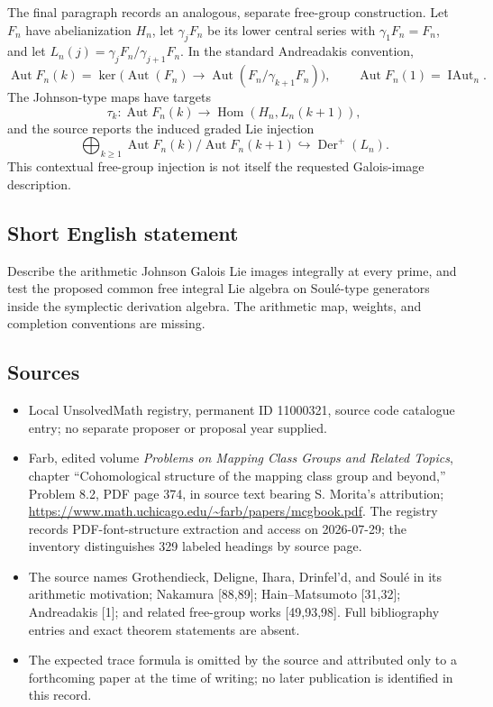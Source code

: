 \documentclass[11pt]{article}
\begin{document}
The final paragraph records an analogous, separate free-group construction. Let $F_n$ have abelianization $H_n$, let $\gamma_jF_n$ be its lower central series with $\gamma_1F_n=F_n$, and let $L_n(j)=\gamma_jF_n/\gamma_{j+1}F_n$. In the standard Andreadakis convention,
\[
 \operatorname{Aut}F_n(k)=\ker\bigl(\operatorname{Aut}(F_n)\to
 \operatorname{Aut}(F_n/\gamma_{k+1}F_n)\bigr),\qquad
 \operatorname{Aut}F_n(1)=\operatorname{IAut}_n.
\]
The Johnson-type maps have targets
\[
 \tau_k:\operatorname{Aut}F_n(k)\to\operatorname{Hom}(H_n,L_n(k+1)),
\]
and the source reports the induced graded Lie injection
\[
 \bigoplus_{k\ge1}\operatorname{Aut}F_n(k)/\operatorname{Aut}F_n(k+1)
 \hookrightarrow\operatorname{Der}^+(L_n).
\]
This contextual free-group injection is not itself the requested Galois-image description.
\subsection{Short English statement}
Describe the arithmetic Johnson Galois Lie images integrally at every prime, and test the proposed common free integral Lie algebra on Soul\'e-type generators inside the symplectic derivation algebra. The arithmetic map, weights, and completion conventions are missing.
\subsection{Sources}
\begin{itemize}
\item Local UnsolvedMath registry, permanent ID 11000321, source code catalogue entry; no separate proposer or proposal year supplied.
\item Farb, edited volume \emph{Problems on Mapping Class Groups and Related Topics}, chapter ``Cohomological structure of the mapping class group and beyond,'' Problem 8.2, PDF page 374, in source text bearing S. Morita's attribution; \url{https://www.math.uchicago.edu/~farb/papers/mcgbook.pdf}. The registry records PDF-font-structure extraction and access on 2026-07-29; the inventory distinguishes 329 labeled headings by source page.
\item The source names Grothendieck, Deligne, Ihara, Drinfel'd, and Soul\'e in its arithmetic motivation; Nakamura [88,89]; Hain--Matsumoto [31,32]; Andreadakis [1]; and related free-group works [49,93,98]. Full bibliography entries and exact theorem statements are absent.
\item The expected trace formula is omitted by the source and attributed only to a forthcoming paper at the time of writing; no later publication is identified in this record.
\end{itemize}
\end{document}
